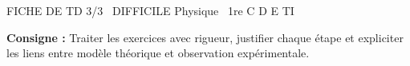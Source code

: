 \documentclass[11pt]{article}
\begin{document}
\begin{tcolorbox}[enhanced,colback=popink,colframe=popink,arc=10pt,boxrule=0pt,left=12pt,right=12pt,top=9pt,bottom=9pt]
{\color{white}\popxbold\small FICHE DE TD 3/3 \textbullet\ DIFFICILE \hfill Physique \textbullet\ 1re C D E TI\par}
\end{tcolorbox}
\vspace{4pt}
\noindent \textbf{Consigne :} Traiter les exercices avec rigueur, justifier chaque étape et expliciter les liens entre modèle théorique et observation expérimentale.
\end{document}
